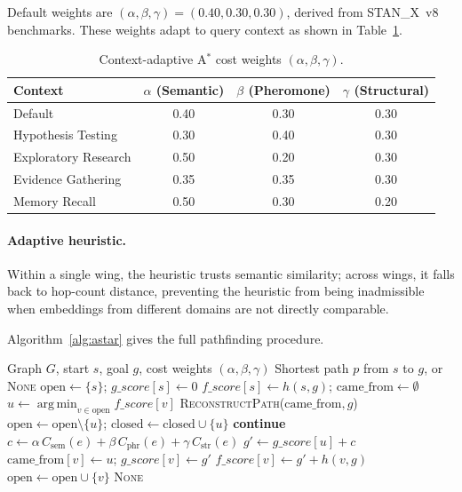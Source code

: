 \documentclass[11pt,a4paper]{article}
\DeclareMathOperator*{\argmin}{arg\,min}
\begin{document}
Default weights are $(\alpha, \beta, \gamma) = (0.40, 0.30, 0.30)$, derived
from STAN\_X~v8 benchmarks.  These weights adapt to query context as shown in
Table~\ref{tab:weights}.

\begin{table}[ht]
\centering
\caption{Context-adaptive A$^*$ cost weights $(\alpha, \beta, \gamma)$.}
\label{tab:weights}
\begin{tabular}{lccc}
\toprule
\textbf{Context} & $\alpha$ (Semantic) & $\beta$ (Pheromone) & $\gamma$ (Structural) \\
\midrule
Default              & 0.40 & 0.30 & 0.30 \\
Hypothesis Testing   & 0.30 & 0.40 & 0.30 \\
Exploratory Research & 0.50 & 0.20 & 0.30 \\
Evidence Gathering   & 0.35 & 0.35 & 0.30 \\
Memory Recall        & 0.50 & 0.30 & 0.20 \\
\bottomrule
\end{tabular}
\end{table}

\paragraph{Adaptive heuristic.}
Within a single wing, the heuristic trusts semantic similarity; across wings,
it falls back to hop-count distance, preventing the heuristic from being
inadmissible when embeddings from different domains are not directly comparable.

Algorithm~\ref{alg:astar} gives the full pathfinding procedure.

\begin{algorithm}[ht]
\caption{Semantic A$^*$ in GraphPalace}
\label{alg:astar}
\begin{algorithmic}[1]
\Require Graph $G$, start $s$, goal $g$, cost weights $(\alpha,\beta,\gamma)$
\Ensure Shortest path $p$ from $s$ to $g$, or \textsc{None}
\State $\text{open} \gets \{s\}$;  $g\_score[s] \gets 0$
\State $f\_score[s] \gets h(s, g)$;  $\text{came\_from} \gets \emptyset$
    \State $u \gets \argmin_{v \in \text{open}} f\_score[v]$
      \Return \textsc{ReconstructPath}($\text{came\_from}, g$) \EndIf
    \State $\text{open} \gets \text{open} \setminus \{u\}$;
           $\text{closed} \gets \text{closed} \cup \{u\}$
         \textbf{continue} \EndIf
        \State $c \gets \alpha\,C_{\text{sem}}(e) + \beta\,C_{\text{phr}}(e) + \gamma\,C_{\text{str}}(e)$
        \State $g' \gets g\_score[u] + c$
            \State $\text{came\_from}[v] \gets u$;  $g\_score[v] \gets g'$
            \State $f\_score[v] \gets g' + h(v, g)$
            \State $\text{open} \gets \text{open} \cup \{v\}$
        \EndIf
    \EndFor
\EndWhile
\Return \textsc{None}
\end{algorithmic}
\end{algorithm}
\end{document}
